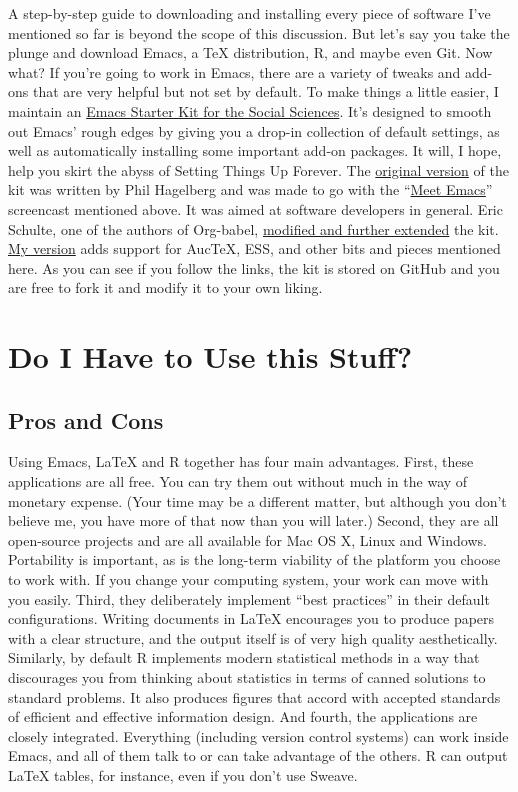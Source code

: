\documentclass[11pt,article,oneside]{memoir}
\begin{document}
A step-by-step guide to downloading and installing every piece of
software I've mentioned so far is beyond the scope of this
discussion. But let's say you take the plunge and download Emacs, a
\TeX{} distribution, R, and maybe even Git. Now what? If you're going
to work in Emacs, there are a variety of tweaks and add-ons that are
very helpful but not set by default. To make things a little easier, I
maintain an \href{http://kjhealy.github.com/emacs-starter-kit/}{Emacs
  Starter Kit for the Social Sciences}. It's designed to smooth out
Emacs' rough edges by giving you a drop-in collection of default
settings, as well as automatically installing some important add-on
packages. It will, I hope, help you skirt the abyss of Setting Things
Up Forever. The
\href{http://github.com/technomancy/emacs-starter-kit/tree/master}{original
  version} of the kit was written by Phil Hagelberg and was made to go
with the ``\href{http://peepcode.com/products/meet-emacs}{Meet
  Emacs}'' screencast mentioned above. It was aimed at software
developers in general.  Eric Schulte, one of the authors of Org-babel,
\href{https://github.com/eschulte/emacs-starter-kit}{modified and
  further extended} the
kit. \href{https://github.com/kjhealy/emacs-starter-kit}{My version}
adds support for AucTeX, ESS, and other bits and pieces mentioned
here. As you can see if you follow the links, the kit is stored on
GitHub and you are free to fork it and modify it to your own liking.

\section*{Do I Have to Use this Stuff?}
\label{sec-8}
\subsection*{Pros and Cons}
\label{sec-8_1}

Using Emacs, \LaTeX{} and R together has four main advantages. First,
these applications are all free. You can try them out without much in
the way of monetary expense. (Your time may be a different matter, but
although you don't believe me, you have more of that now than you will
later.) Second, they are all open-source projects and are all
available for Mac OS X, Linux and Windows. Portability is important,
as is the long-term viability of the platform you choose to work
with. If you change your computing system, your work can move with you
easily. Third, they deliberately implement ``best practices'' in their
default configurations. Writing documents in \LaTeX{} encourages you to
produce papers with a clear structure, and the output itself is of
very high quality aesthetically. Similarly, by default R implements
modern statistical methods in a way that discourages you from thinking
about statistics in terms of canned solutions to standard problems. It
also produces figures that accord with accepted standards of efficient
and effective information design. And fourth, the applications are
closely integrated. Everything (including version control systems) can
work inside Emacs, and all of them talk to or can take advantage of
the others. R can output \LaTeX{} tables, for instance, even if you don't
use Sweave.
\end{document}
